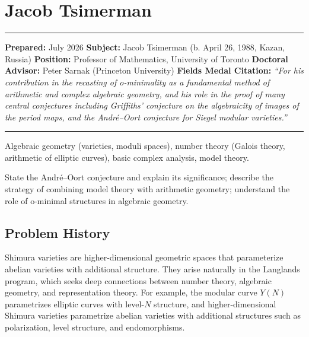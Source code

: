 \chapter{Jacob Tsimerman}\label{ch2026jacobtsimerman:jacob-tsimerman-fields-medal-2026}

\begin{center}\rule{0.5\linewidth}{0.5pt}\end{center}

\textbf{Prepared:} July 2026 \textbf{Subject:} Jacob Tsimerman (b. April 26, 1988, Kazan, Russia) \textbf{Position:} Professor of Mathematics, University of Toronto \textbf{Doctoral Advisor:} Peter Sarnak (Princeton University) \textbf{Fields Medal Citation:} \emph{``For his contribution in the recasting of o-minimality as a fundamental method of arithmetic and complex algebraic geometry, and his role in the proof of many central conjectures including Griffiths' conjecture on the algebraicity of images of the period maps, and the Andr\'{e}--Oort conjecture for Siegel modular varieties.''}

\begin{center}\rule{0.5\linewidth}{0.5pt}\end{center}

\begin{prereqs} Algebraic geometry (varieties, moduli spaces), number theory (Galois theory, arithmetic of elliptic curves), basic complex analysis, model theory. \end{prereqs}

\begin{objectives} State the Andr\'{e}--Oort conjecture and explain its significance; describe the strategy of combining model theory with arithmetic geometry; understand the role of o-minimal structures in algebraic geometry. \end{objectives}

\section{Problem History}

Shimura varieties are higher-dimensional geometric spaces that parameterize abelian varieties with additional structure. They arise naturally in the Langlands program, which seeks deep connections between number theory, algebraic geometry, and representation theory. For example, the modular curve $Y(N)$ parametrizes elliptic curves with level-$N$ structure, and higher-dimensional Shimura varieties parametrize abelian varieties with additional structures such as polarization, level structure, and endomorphisms.


